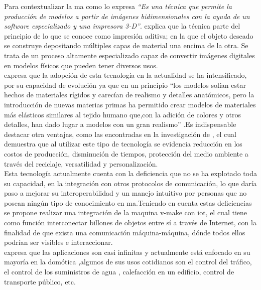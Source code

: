 Para contextualizar la \acrshort{ma} como lo expresa \cite{heinze} \textit{“Es una técnica que permite la producción de modelos a partir de imágenes bidimensionales con la ayuda de un software   especializado   y   una   impresora   3-D”}. \cite{blaquez}  explica que la técnica parte del principio de lo que se conoce como impresión aditiva; en la que el objeto deseado se construye depositando múltiples capas de material una encima de la otra. Se trata de un proceso altamente especializado capaz de convertir imágenes digitales en modelos físicos que pueden tener diversos usos. \\


\cite{chen} expresa que la adopción de esta tecnología en la actualidad se ha intensificado, por su capacidad de evolución ya que en un principio “los modelos solían estar hechos de materiales rígidos y carecían de realismo y detalles anatómicos, pero la introducción de nuevas materias primas ha permitido crear modelos de materiales más elásticos similares al tejido humano que,con la adición de colores y otros detalles, han dado lugar a modelos con un gran realismo” .Es indispensable destacar otra ventajas, como las encontradas en la investigación de \cite{reyes}, el cual demuestra que al utilizar este tipo de tecnología se evidencia reducción en los costos de producción, disminución de tiempos, protección del medio ambiente a través del reciclaje, versatilidad y personalización. \\


Esta tecnología actualmente cuenta con la deficiencia que no se ha explotado toda su capacidad, en la integración con otros protocolos de comunicación, lo que daría paso a mejorar su interoperabilidad y un manejo intuitivo por personas que no posean ningún tipo de conocimiento en \acrshort{ma}.Teniendo en cuenta estas deficiencias se propone realizar una integración de la maquina v-make con \acrshort{iot}, el cual tiene como función interconectar billones de objetos entre sí a través de Internet, con la finalidad de que exista una comunicación máquina-máquina, dónde todos ellos podrían ser visibles e interaccionar.\\

\citep{reyes} expresa que las aplicaciones son casi infinitas y actualmente está enfocado en su mayoría en la domótica ,algunos de sus usos cotidianos son el control del tráfico, el control de los suministros de agua , calefacción en un edificio,  control de transporte público, etc.\\ %

